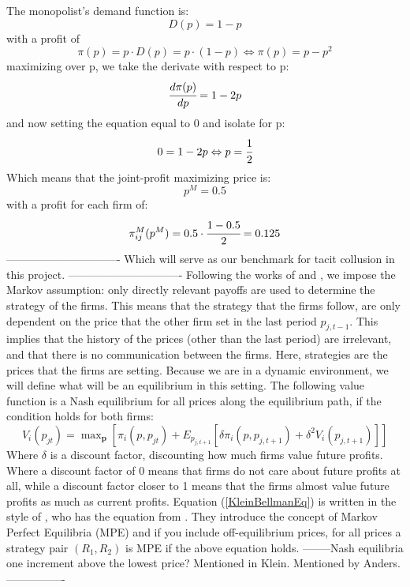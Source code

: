 \documentclass{article}
\begin{document}
\newline
The monopolist's demand function is:
\begin{equation}
    D(p) = 1-p
\end{equation}
with a profit of
\begin{equation}
    \pi (p) = p \cdot D(p) = p \cdot (1-p) \Leftrightarrow \pi (p) = p - p^2
\end{equation}
maximizing over p, we take the derivate with respect to p: 
\begin{equation}
    \cfrac{d \pi(p) }{d p} = 1-2p
\end{equation}
and now setting the equation equal to 0 and isolate for p:
\begin{equation}
    0 = 1 - 2p \Leftrightarrow p = \cfrac{1}{2}
\end{equation}
Which means that the joint-profit maximizing price is:
\begin{equation}
    p^M = 0.5
\end{equation}
with a profit for each firm of:
\begin{equation}
\pi_{ij}^M (p^M) = 0.5 \cdot \cfrac{1 - 0.5}{2} = 0.125
\end{equation}
-------------------------------
Which will serve as our benchmark for tacit collusion in this project.  
-------------------------------
\label{Joint_profit_price}
\newline
Following the works of \cite{Klein2021} and \cite{MaskinTirole}, we impose the Markov assumption: only directly relevant payoffs are used to determine the strategy of the firms. This means that the strategy that the firms follow, are only dependent on the price that the other firm set in the last period $p_{j,t-1}$. This implies that the history of the prices (other than the last period) are irrelevant, and that there is no communication between the firms.
Here, strategies are the prices that the firms are setting.
\newline
Because we are in a dynamic environment, we will define what will be an equilibrium in this setting. 
The following value function is a Nash equilibrium for all prices along the equilibrium path, if the condition holds for both firms:
\begin{equation} \label{KleinBellmanEq}
    V_i(p_{jt}) = \mathop{\text{max}}_{\textbf{p}} [\pi_i (p,p_{jt}) + E_{p_{j,t+1}}[\delta \pi_i (p,p_{j,t+1})+\delta^2 V_i (p_{j,t+1}) ]]
\end{equation}
Where $\delta$ is a discount factor, discounting how much firms value future profits. Where a discount factor of 0 means that firms do not care about future profits at all, while a discount factor closer to 1 means that the firms almost value future profits as much as current profits. 
Equation (\ref{KleinBellmanEq}) is written in the style of \cite{Klein2021}, who has the equation from \cite{MaskinTirole}. They introduce the concept of Markov Perfect Equilibria (MPE) and if you include off-equilibrium prices, for all prices a strategy pair $(R_1,R_2)$ is MPE if the above equation holds.
\newline
--------Nash equilibria one increment above the lowest price? Mentioned in Klein. Mentioned by Anders.----------------
\newline
\end{document}
